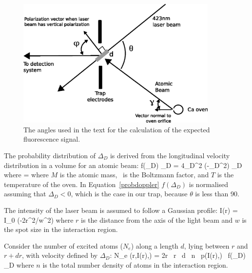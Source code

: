 \begin{figure}[t]
\centering
\includegraphics[width=10cm]{chapter5/angles_v3}
\caption[Angles of atomic beam, laser beam and detection]{The angles used in the text for the calculation of the expected fluorescence signal.}
\label{fig:angles}
\end{figure} 

The probability distribution of $\Delta_D$ is derived from the longitudinal velocity distribution in a volume for an atomic beam:
\be
f(\Delta_D) \der\Delta_D = 4\Delta_D^2 \exp\left(-\beta \Delta_D^2\right) \der\Delta_D
\label{probdoppler}
\ee
where
\be
\beta =  
\ee
where $M$ is the atomic mass, \kB\, is the Boltzmann factor, and $T$ is the temperature of the oven. In Equation~\ref{probdoppler} $f(\Delta_D)$ is normalised assuming that $\Delta_D < 0$, which is the case in our trap, because $\theta$ is less than 90\degree.

The intensity of the laser beam is assumed to follow a Gaussian profile:
\be
I(r) = I_0 \exp(-2r^2/w^2)
\ee
where $r$ is the distance from the axis of the light beam and $w$ is the spot size in the interaction region.

Consider the number of excited atoms ($N_e$) along a length $d$, lying between $r$ and $r+dr$, with velocity defined by $\Delta_D$:
\be
\der N_e (r,I(r),\Delta) = 2\pi r \, \der r \, d \, n \, p(I(r),\Delta) \, f(\Delta_D) \der\Delta_D
\label{dn}
\ee
where $n$ is the total number density of atoms in the interaction region.

